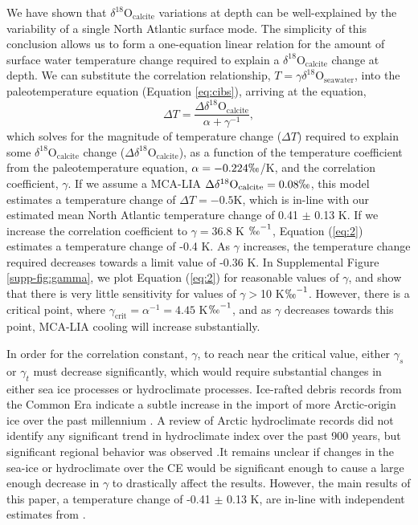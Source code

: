 \documentclass[draft]{agujournal2019}
\begin{document}
We have shown that $\delta^{18}\mathrm{O}_{\mathrm{calcite}}$ variations at depth can be well-explained by the variability of a single North Atlantic surface mode. The simplicity of this conclusion allows us to form a one-equation linear relation for the amount of surface water temperature change required to explain a $\delta^{18}\mathrm{O}_{\mathrm{calcite}}$ change at depth. We can substitute the correlation relationship, $T = \gamma \delta^{18}\mathrm{O}_{\mathrm{seawater}}$, into the paleotemperature equation (Equation \ref{eq:cibs}), arriving at the equation, 
\begin{equation}
\label{eq:2}
\Delta T = \frac{\Delta \delta^{18}\mathrm{O}_{\mathrm{calcite}}}{\alpha + \gamma^{-1}},
\end{equation}
which solves for the magnitude of temperature change ($\Delta T$) required to explain some $\delta^{18}\mathrm{O}_{\mathrm{calcite}}$ change ($\Delta \delta^{18}\mathrm{O}_{\mathrm{calcite}}$), as a function of the temperature coefficient from the paleotemperature equation, $\alpha = -0.224 \permil$/K, and the correlation coefficient, $\gamma$. If we assume a MCA-LIA $\Delta \delta^{18}\mathrm{O}_{\mathrm{calcite}} = 0.08 \permil$, this model estimates a temperature change of $\Delta T = -0.5$K, which is in-line with our estimated mean North Atlantic temperature change of 0.41 $\pm$ 0.13 K. If we increase the correlation coefficient to $\gamma = 36.8$ K $\permil^{-1}$, Equation (\ref{eq:2}) estimates a temperature change of -0.4 K. As $\gamma$ increases, the temperature change required decreases towards a limit value of -0.36 K. In Supplemental Figure \ref{supp-fig:gamma}, we plot Equation (\ref{eq:2}) for reasonable values of $\gamma$, and show that there is very little sensitivity for values of $\gamma >$10 K$\permil^{-1}$. However, there is a critical point, where $\gamma_{\mathrm{crit}} = \alpha^{-1} = 4.45$ K$\permil^{-1}$, and as $\gamma$ decreases towards this point, MCA-LIA cooling will increase substantially.

In order for the correlation constant, $\gamma$, to reach near the critical value, either $\gamma_{s}$ or $\gamma_{t}$ must decrease significantly, which would require substantial changes in either sea ice processes or hydroclimate processes. Ice-rafted debris records from the Common Era indicate a subtle increase in the import of more Arctic-origin ice over the past millennium \cite[]{Alonso-Garcia-Kleiven-2017:Freshening}. A review of Arctic hydroclimate records did not identify any significant trend in hydroclimate index over the past 900 years, but significant regional behavior was observed \cite[]{Linderholm-Nicolle-2018:Arctic}.It remains unclear if changes in the sea-ice or hydroclimate over the CE would be significant enough to cause a large enough decrease in $\gamma$ to drastically affect the results. However, the main results of this paper, a temperature change of -0.41 $\pm$ 0.13 K, are in-line with independent estimates from . 
\end{document}
